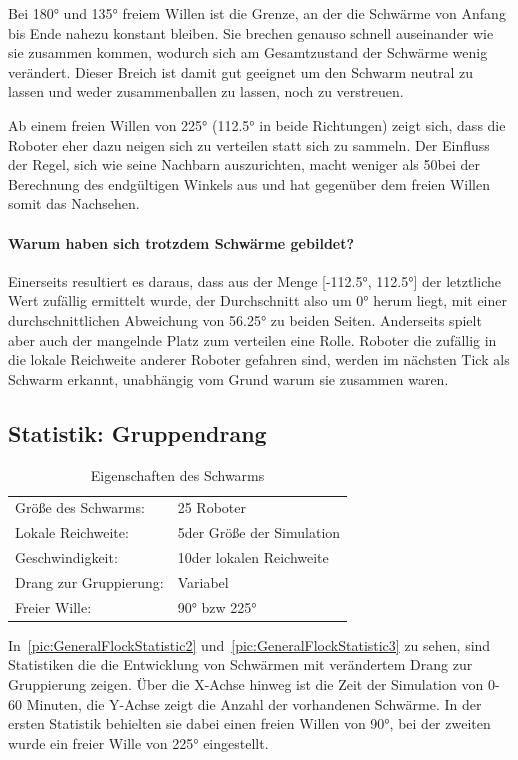 Bei 180° und 135° freiem Willen ist die Grenze, an der die Schwärme von Anfang bis Ende nahezu konstant bleiben. Sie brechen genauso schnell auseinander wie sie zusammen kommen, wodurch sich am Gesamtzustand der Schwärme wenig verändert. Dieser Breich ist damit gut geeignet um den Schwarm neutral zu lassen und weder zusammenballen zu lassen, noch zu verstreuen.

Ab einem freien Willen von 225° (112.5° in beide Richtungen) zeigt sich, dass die Roboter eher dazu neigen sich zu verteilen statt sich zu sammeln. Der Einfluss der Regel, sich wie seine Nachbarn auszurichten, macht weniger als 50\per bei der Berechnung des endgültigen Winkels aus und hat gegenüber dem freien Willen somit das Nachsehen.

\paragraph*{Warum haben sich trotzdem Schwärme gebildet?}
Einerseits resultiert es daraus, dass aus der Menge [-112.5°, 112.5°] der letztliche Wert zufällig ermittelt wurde, der Durchschnitt also um 0° herum liegt, mit einer durchschnittlichen Abweichung von 56.25° zu beiden Seiten.
Anderseits spielt aber auch der mangelnde Platz zum verteilen eine Rolle. Roboter die zufällig in die lokale Reichweite anderer Roboter gefahren sind, werden im nächsten Tick als Schwarm erkannt, unabhängig vom Grund warum sie zusammen waren.

\subsection*{Statistik: Gruppendrang}

\begin{table}[h]
	\caption{Eigenschaften des Schwarms}
	\begin{tabular}{ll}
		Größe des Schwarms:		& 25 Roboter \\
		Lokale Reichweite:		& 5\per der Größe der Simulation \\
		Geschwindigkeit:		& 10\per der lokalen Reichweite \\
		Drang zur Gruppierung:	& Variabel \\
		Freier Wille:			& 90° bzw 225° \\
	\end{tabular}
\end{table}

In~\autoref{pic:GeneralFlockStatistic2} und~\autoref{pic:GeneralFlockStatistic3} zu sehen, sind Statistiken die die Entwicklung von Schwärmen mit verändertem Drang zur Gruppierung zeigen. Über die X-Achse hinweg ist die Zeit der Simulation von 0-60 Minuten, die Y-Achse zeigt die Anzahl der vorhandenen Schwärme. In der ersten Statistik behielten sie dabei einen freien Willen von 90°, bei der zweiten wurde ein freier Wille von 225° eingestellt.


